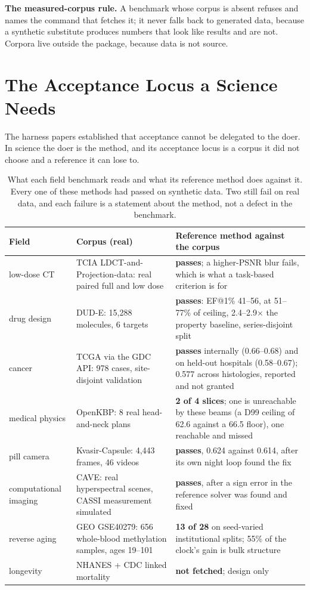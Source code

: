 \documentclass[11pt]{article}
\theoremstyle{definition}
\begin{document}
\textbf{The measured-corpus rule.} A benchmark whose corpus is absent refuses and names the command that fetches it; it never falls back to generated data, because a synthetic substitute produces numbers that look like results and are not. Corpora live outside the package, because data is not source.

\section{The Acceptance Locus a Science Needs}\label{sec:locus}

The harness papers established that acceptance cannot be delegated to the doer. In science the doer is the method, and its acceptance locus is a corpus it did not choose and a reference it can lose to.

\begin{table}[!htbp]
\centering\scriptsize
\begin{tabularx}{\textwidth}{@{}lYY@{}}
\toprule
Field & Corpus (real) & Reference method against the corpus \\
\midrule
low-dose CT & TCIA LDCT-and-Projection-data: real paired full and low dose & \textbf{passes}; a higher-PSNR blur fails, which is what a task-based criterion is for \\
drug design & DUD-E: 15,288 molecules, 6 targets & \textbf{passes}: EF@1\% 41--56, at 51--77\% of ceiling, 2.4--2.9$\times$ the property baseline, series-disjoint split \\
cancer & TCGA via the GDC API: 978 cases, site-disjoint validation & \textbf{passes} internally (0.66--0.68) and on held-out hospitals (0.58--0.67); 0.577 across histologies, reported and not granted \\
medical physics & OpenKBP: 8 real head-and-neck plans & \textbf{2 of 4 slices}; one is unreachable by these beams (a D99 ceiling of 62.6 against a 66.5 floor), one reachable and missed \\
pill camera & Kvasir-Capsule: 4,443 frames, 46 videos & \textbf{passes}, 0.624 against 0.614, after its own night loop found the fix \\
computational imaging & CAVE: real hyperspectral scenes, CASSI measurement simulated & \textbf{passes}, after a sign error in the reference solver was found and fixed \\
reverse aging & GEO GSE40279: 656 whole-blood methylation samples, ages 19--101 & \textbf{13 of 28} on seed-varied institutional splits; 55\% of the clock's gain is bulk structure \\
longevity & NHANES + CDC linked mortality & \textbf{not fetched}; design only \\
\bottomrule
\end{tabularx}
\caption{What each field benchmark reads and what its reference method does against it. Every one of these methods had passed on synthetic data. Two still fail on real data, and each failure is a statement about the method, not a defect in the benchmark.}
\label{tab:corpora}
\end{table}
\end{document}
